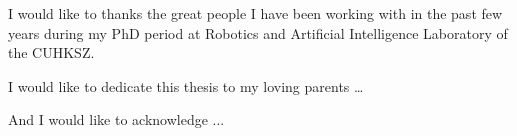 
\begin{acknowledgements}

I would like to thanks the great people I have been working with in the past few years during my PhD period at Robotics and Artificial Intelligence Laboratory of  the CUHKSZ.

I would like to dedicate this thesis to my loving parents \dots

And I would like to acknowledge ...


\end{acknowledgements}
